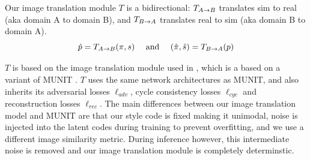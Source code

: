 \documentclass{article}
\begin{document}









	
	Our image translation module $T$ is a bidirectional: $T_{A\rightarrow B}$ translates sim to real (aka domain A to domain B), and $T_{B\rightarrow A}$ translates real to sim (aka domain B to domain A).
	\begin{equation}
		\hat{p}=T_{A\rightarrow B}(\pi,s)  \ \ \ \text{ and }\ \ \   (\hat{\pi},\hat{s})=T_{B\rightarrow A}(p)
	\end{equation}
		
	$T$ is based on the image translation module used in \citep{surgical_video_translation}, which is a based on a variant \cite{surgical_image_translation} of MUNIT \cite{munit}. 
	$T$ uses the same network architectures as MUNIT, and also inherits its adversarial losses $\ell_{adv}$, cycle consistency losses $\ell_{cyc}$ and reconstruction losses $\ell_{rec}$.
	The main differences between our image translation model and MUNIT are that our style code is fixed making it unimodal, noise is injected into the latent codes during training to prevent overfitting, and we use a different image similarity metric. 
	During inference however, this intermediate noise is removed and our image translation module is completely determinstic. 
\end{document}
